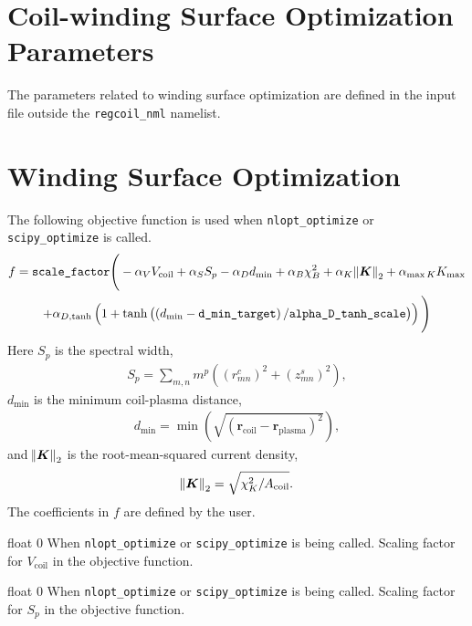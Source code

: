 \section{Coil-winding Surface Optimization Parameters}

\myhrule

The parameters related to winding surface optimization are defined in the input file outside the \texttt{regcoil\_nml} namelist. 

\myhrule

\section{Winding Surface Optimization}

The following objective function is used when \texttt{nlopt\_optimize} or \texttt{scipy\_optimize} is called.
\begin{multline}
f = \texttt{scale\_factor} \Bigg( -\alpha_V V_{\text{coil}} + \alpha_S S_p - \alpha_D d_{\text{min}} + \alpha_B \chi^2_B + \alpha_K \norm{\bm{K}}_2 + \alpha_{\max K} K_{\max} \\ + \alpha_{D,\tanh} \left(1 + \tanh\left( \left( d_{\min}-\texttt{d\_min\_target} \right)/\texttt{alpha\_D\_tanh\_scale} \right) \right) \Bigg)
\end{multline}
Here $S_p$ is the spectral width,
\begin{gather}
S_p = \sum_{m,n} m^p \left( \left(r_{mn}^c\right)^2 + \left(z_{mn}^s\right)^2 \right),
\label{spectral_width}
\end{gather}
$d_{\text{min}}$ is the minimum coil-plasma distance,
\begin{gather}
d_{\text{min}} = \min \left( \sqrt{ \left(\bm{r}_{\text{coil}} - \bm{r}_{\text{plasma}} \right)^2 } \right),
\end{gather}
and $\norm{\bm{K}}_2$ is the root-mean-squared current density,
\begin{gather}
\norm{\bm{K}}_2 = \sqrt{\chi^2_K/A_{\text{coil}}}.
\end{gather}
The coefficients in $f$ are defined by the user. 

\myhrule

{float}
{0}
{When \texttt{nlopt\_optimize} or \texttt{scipy\_optimize} is being called.}
{Scaling factor for $V_{\text{coil}}$ in the objective function.}

\myhrule

{float}
{0}
{When \texttt{nlopt\_optimize} or \texttt{scipy\_optimize} is being called.}
{Scaling factor for $S_p$ in the objective function.}

